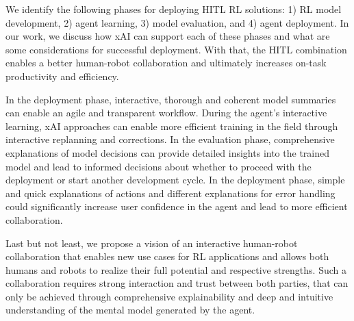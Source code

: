 \documentclass[twoside,11pt]{article}
\begin{document}
\begin{enumerate}
We identify the following phases for deploying HITL RL solutions: 1) RL model development, 2) agent learning, 3) model evaluation, and 4) agent deployment. In our work, we discuss how xAI can support each of these phases and what are some considerations for successful deployment. With that, the HITL combination enables a better human-robot collaboration and ultimately increases on-task productivity and efficiency.

In the deployment phase, interactive, thorough and coherent model summaries can enable an agile and transparent workflow. During the agent's interactive learning, xAI approaches can enable more efficient training in the field through interactive replanning and corrections. In the evaluation phase, comprehensive explanations of model decisions can provide detailed insights into the trained model and lead to informed decisions about whether to proceed with the deployment or start another development cycle. In the deployment phase, simple and quick explanations of actions and different explanations for error handling could significantly increase user confidence in the agent and lead to more efficient collaboration.

Last but not least, we propose a vision of an interactive human-robot collaboration that enables new use cases for RL applications and allows both humans and robots to realize their full potential and respective strengths. Such a collaboration requires strong interaction and trust between both parties, that can only be achieved through comprehensive explainability and deep and intuitive understanding of the mental model generated by the agent.

\end{enumerate}
\end{document}
